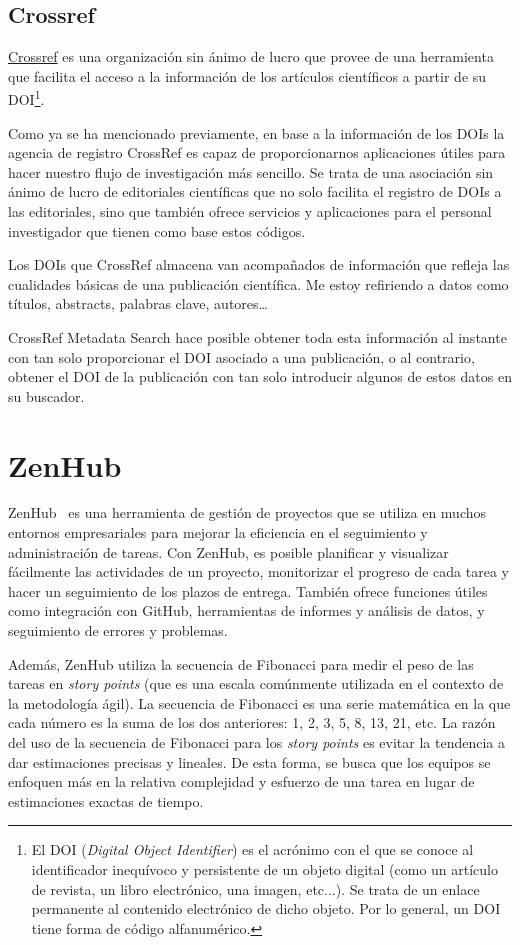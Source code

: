 \subsection{Crossref}

 \href{https://www.crossref.org/}{Crossref} es una organización sin ánimo de lucro que provee de una herramienta que facilita el acceso a la información de los artículos científicos a partir de su DOI\footnote{El DOI (\textit{Digital Object Identifier}) es el acrónimo con el que se conoce al identificador inequívoco y persistente de un objeto digital (como un artículo de revista, un libro electrónico, una imagen, etc...). Se trata de un enlace permanente al contenido electrónico de dicho objeto. Por lo general, un DOI tiene forma de código alfanumérico.}.

Como ya se ha mencionado previamente, en base a la información de los DOIs la agencia de registro CrossRef es capaz de proporcionarnos aplicaciones útiles para hacer nuestro flujo de investigación más sencillo.
Se trata de una asociación sin ánimo de lucro de editoriales científicas que no solo facilita el registro de DOIs a las editoriales, sino que también ofrece servicios y aplicaciones para el personal investigador que tienen como base estos códigos.

Los DOIs que CrossRef almacena van acompañados de información que refleja las cualidades básicas de una publicación científica. Me estoy refiriendo a datos como títulos, abstracts, palabras clave, autores…

CrossRef Metadata Search hace posible obtener toda esta información al instante con tan solo proporcionar el DOI asociado a una publicación, o al contrario, obtener el DOI de la publicación con tan solo introducir algunos de estos datos en su buscador.

\section{ZenHub}
ZenHub~\cite{Zenhub} es una herramienta de gestión de proyectos que se utiliza en muchos entornos empresariales para mejorar la eficiencia en el seguimiento y administración de tareas. Con ZenHub, es posible planificar y visualizar fácilmente las actividades de un proyecto, monitorizar el progreso de cada tarea y hacer un seguimiento de los plazos de entrega. También ofrece funciones útiles como integración con GitHub, herramientas de informes y análisis de datos, y seguimiento de errores y problemas.

Además, ZenHub utiliza la secuencia de Fibonacci para medir el peso de las tareas en \textit{story points} (que es una escala comúnmente utilizada en el contexto de la metodología ágil). La secuencia de Fibonacci es una serie matemática en la que cada número es la suma de los dos anteriores: 1, 2, 3, 5, 8, 13, 21, etc. La razón del uso de la secuencia de Fibonacci para los \textit{story points} es evitar la tendencia a dar estimaciones precisas y lineales. De esta forma, se busca que los equipos se enfoquen más en la relativa complejidad y esfuerzo de una tarea en lugar de estimaciones exactas de tiempo.





